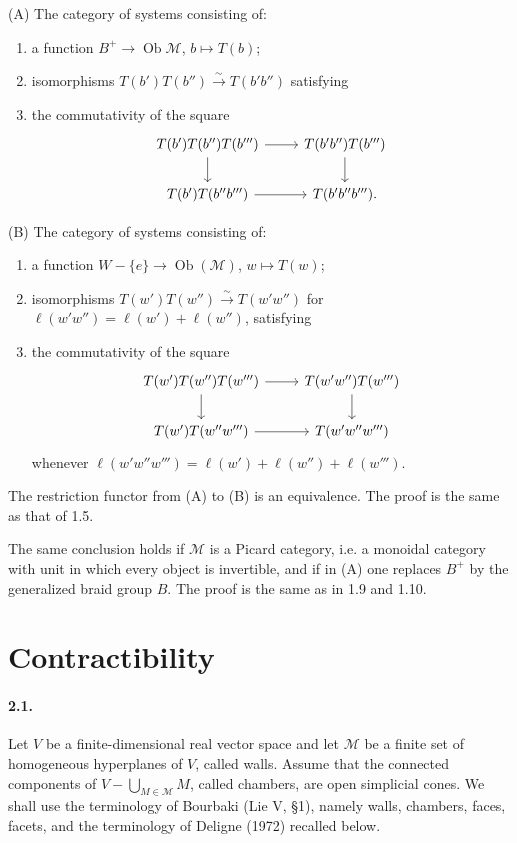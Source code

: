 \documentclass[11pt]{article}
\newcommand{\Ob}{\operatorname{Ob}}
\newcommand{\calM}{\mathcal M}
\begin{document}
(A) The category of systems consisting of:
\begin{enumerate}[label=(A.\arabic*)]
\item a function $B^+\to\Ob\calM$, $b\mapsto T(b)$;
\item isomorphisms $T(b')T(b'')\xrightarrow{\sim}T(b'b'')$ satisfying
\item the commutativity of the square
\[
\begin{tikzcd}
T(b')T(b'')T(b''') \arrow[r] \arrow[d] & T(b'b'')T(b''') \arrow[d]\\
T(b')T(b''b''') \arrow[r] & T(b'b''b''').
\end{tikzcd}
\]
\end{enumerate}

(B) The category of systems consisting of:
\begin{enumerate}[label=(B.\arabic*)]
\item a function $W-\{e\}\to\Ob(\calM)$, $w\mapsto T(w)$;
\item isomorphisms $T(w')T(w'')\xrightarrow{\sim}T(w'w'')$ for $\ell(w'w'')=\ell(w')+\ell(w'')$, satisfying
\item the commutativity of the square
\[
\begin{tikzcd}
T(w')T(w'')T(w''') \arrow[r] \arrow[d] & T(w'w'')T(w''') \arrow[d]\\
T(w')T(w''w''') \arrow[r] & T(w'w''w''')
\end{tikzcd}
\]
whenever $\ell(w'w''w''')=\ell(w')+\ell(w'')+\ell(w''')$.
\end{enumerate}
The restriction functor from (A) to (B) is an equivalence. The proof is the same as that of 1.5.

The same conclusion holds if $\calM$ is a Picard category, i.e. a monoidal category with unit in which every object is invertible, and if in (A) one replaces $B^+$ by the generalized braid group $B$. The proof is the same as in 1.9 and 1.10.

\section{Contractibility}
\paragraph{2.1.} Let $V$ be a finite-dimensional real vector space and let $\calM$ be a finite set of homogeneous hyperplanes of $V$, called walls. Assume that the connected components of $V-\bigcup_{M\in\calM}M$, called chambers, are open simplicial cones. We shall use the terminology of Bourbaki (Lie V, \S1), namely walls, chambers, faces, facets, and the terminology of Deligne (1972) recalled below.
\end{document}

